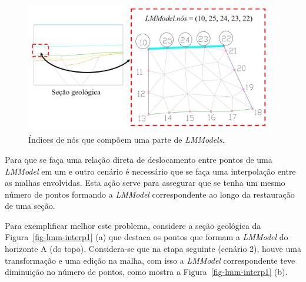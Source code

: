 \begin{figure} [H]
  \begin{center}
    \includegraphics[width=310pt]{images/fig-lmm-mesh-boundary}
    \caption{Índices de nós que compõem uma parte de \textit{LMModels}.}\label{fig-lmm-mesh-boundary}
  \end{center}
\end{figure}

Para que se faça uma relação direta de deslocamento entre pontos de uma \textit{LMModel} em um e outro cenário é necessário que se faça uma interpolação entre as malhas envolvidas. Esta ação serve para assegurar que se tenha um mesmo número de pontos formando a \textit{LMModel} correspondente ao longo da restauração de uma seção.

Para exemplificar melhor este problema, considere a seção geológica da Figura~\ref{fig-lmm-interp1} (a) que destaca os pontos que formam a \textit{LMModel} do horizonte A (do topo). Considera-se que na etapa seguinte (cenário 2), houve uma transformação e uma edição na malha, com isso a \textit{LMModel} correspondente teve diminuição no número de pontos, como mostra a Figura~\ref{fig-lmm-interp1} (b).

